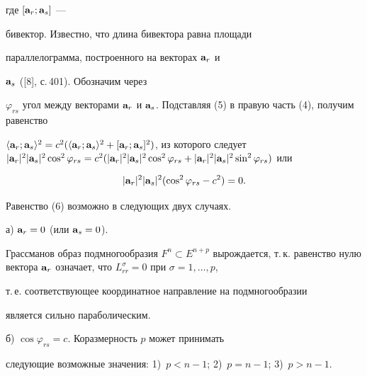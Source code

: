 \begin{pf}
где $[\bold a_{r};\bold a_{s}]$ ---


бивектор. Известно, что длина бивектора равна площади


параллелограмма, построенного на векторах $\bold a_{r}$ и


$\bold a_{s}$ ([8], с.\,401). Обозначим через


$\varphi_{rs}$ угол между векторами $\bold a_{r}$ и $\bold


a_{s}$. Подставляя (5) в правую часть (4), получим равенство


$\langle \bold a_{r};\bold a_{s}\rangle^{2}=c^{2}(\langle


\bold a_{r};\bold a_{s}\rangle^{2}+[\bold a_{r};\bold


a_{s}]^{2})$, из которого следует $|\bold


a_{r}|^{2}|\bold a_{s}|^{2}\cos^{2}\varphi_{rs}=


c^{2}(|\bold a_{r}|^{2}|\bold


a_{s}|^{2}\cos^{2}\varphi_{rs}+|\bold a_{r}|^{2}|\bold


a_{s}|^{2}\sin^{2}\varphi_{rs})$ или


\begin{equation}


|\bold a_{r}|^{2}|\bold a_{s}|^{2}(\cos^{2}\varphi_{rs}-c^{2})=0.


\end{equation}


Равенство (6) возможно в следующих двух случаях.





а) $\bold a_{r}=0$ (или $\bold a_{s}=0 $). 


Грассманов образ подмногообразия $F^{n}\subset


E^{n+p}$ вырождается, т.\,к. равенство нулю вектора $\bold


a_{r}$ означает, что $L_{rr}^{\sigma}=0$ при $\sigma=1,\dotsc,p$,


т.\,е. соответствующее координатное направление на подмногообразии


является сильно параболическим.





б) $ \cos\varphi_{rs}=c$. Коразмерность $p$ может принимать


следующие возможные значения: 1)~$p<n-1$; 2)~$p=n-1$; 3)~$p>n-1$.






\end{pf}
